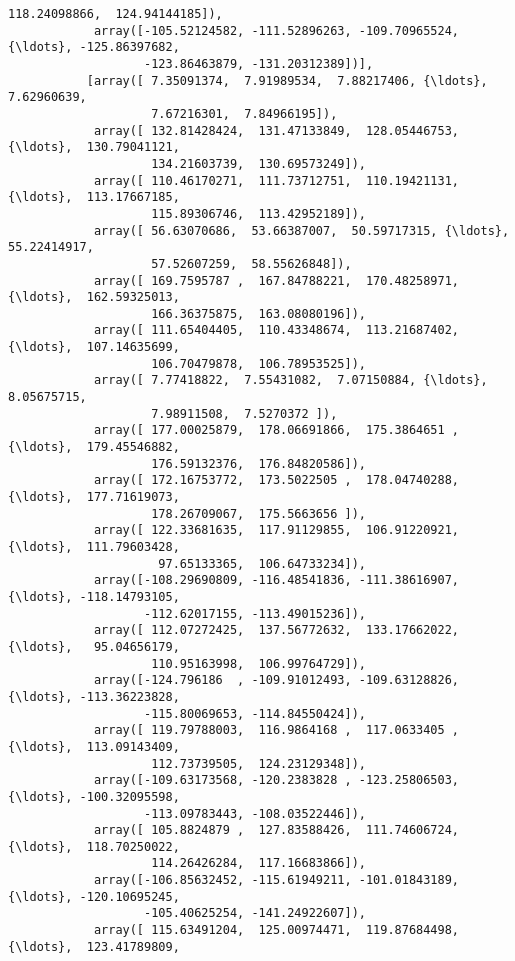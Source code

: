 \documentclass[11pt]{article}
\begin{document}
\begin{Verbatim}[commandchars=\\\{\}]
                    118.24098866,  124.94144185]),
            array([-105.52124582, -111.52896263, -109.70965524, {\ldots}, -125.86397682,
                   -123.86463879, -131.20312389])],
           [array([ 7.35091374,  7.91989534,  7.88217406, {\ldots},  7.62960639,
                    7.67216301,  7.84966195]),
            array([ 132.81428424,  131.47133849,  128.05446753, {\ldots},  130.79041121,
                    134.21603739,  130.69573249]),
            array([ 110.46170271,  111.73712751,  110.19421131, {\ldots},  113.17667185,
                    115.89306746,  113.42952189]),
            array([ 56.63070686,  53.66387007,  50.59717315, {\ldots},  55.22414917,
                    57.52607259,  58.55626848]),
            array([ 169.7595787 ,  167.84788221,  170.48258971, {\ldots},  162.59325013,
                    166.36375875,  163.08080196]),
            array([ 111.65404405,  110.43348674,  113.21687402, {\ldots},  107.14635699,
                    106.70479878,  106.78953525]),
            array([ 7.77418822,  7.55431082,  7.07150884, {\ldots},  8.05675715,
                    7.98911508,  7.5270372 ]),
            array([ 177.00025879,  178.06691866,  175.3864651 , {\ldots},  179.45546882,
                    176.59132376,  176.84820586]),
            array([ 172.16753772,  173.5022505 ,  178.04740288, {\ldots},  177.71619073,
                    178.26709067,  175.5663656 ]),
            array([ 122.33681635,  117.91129855,  106.91220921, {\ldots},  111.79603428,
                     97.65133365,  106.64733234]),
            array([-108.29690809, -116.48541836, -111.38616907, {\ldots}, -118.14793105,
                   -112.62017155, -113.49015236]),
            array([ 112.07272425,  137.56772632,  133.17662022, {\ldots},   95.04656179,
                    110.95163998,  106.99764729]),
            array([-124.796186  , -109.91012493, -109.63128826, {\ldots}, -113.36223828,
                   -115.80069653, -114.84550424]),
            array([ 119.79788003,  116.9864168 ,  117.0633405 , {\ldots},  113.09143409,
                    112.73739505,  124.23129348]),
            array([-109.63173568, -120.2383828 , -123.25806503, {\ldots}, -100.32095598,
                   -113.09783443, -108.03522446]),
            array([ 105.8824879 ,  127.83588426,  111.74606724, {\ldots},  118.70250022,
                    114.26426284,  117.16683866]),
            array([-106.85632452, -115.61949211, -101.01843189, {\ldots}, -120.10695245,
                   -105.40625254, -141.24922607]),
            array([ 115.63491204,  125.00974471,  119.87684498, {\ldots},  123.41789809,

\end{Verbatim}
\end{document}
